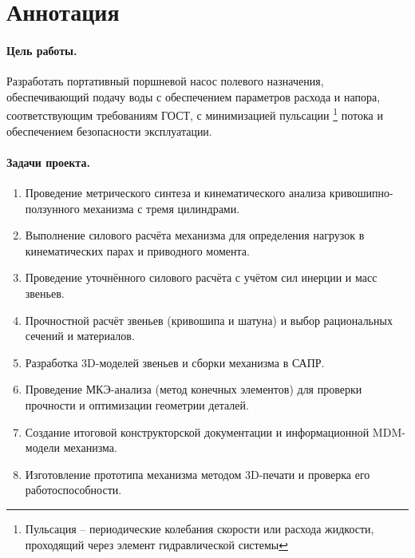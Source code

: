 \documentclass[12pt]{extarticle}
\begin{document}

\tableofcontents
\fancyhead[L]{\textit{\leftmark}}
\fancyhead[R]{}
\fancyfoot[C]{\thepage}
\clearpage

\section{Аннотация}
\paragraph{Цель работы.} Разработать портативный поршневой насос полевого назначения, обеспечивающий подачу воды
с обеспечением параметров расхода и напора, соответствующим требованиям ГОСТ, с минимизацией пульсации
\footnote{Пульсация -- периодические колебания скорости или расхода жидкости, проходящий через элемент гидравлической системы}
потока и обеспечением безопасности эксплуатации.

\paragraph{Задачи проекта.}
\begin{enumerate}
    \item Проведение метрического синтеза и кинематического анализа кривошипно-ползунного механизма с
    тремя цилиндрами.
    \item Выполнение силового расчёта механизма для определения нагрузок в кинематических парах и
    приводного момента.
    \item Проведение уточнённого силового расчёта с учётом сил инерции и масс звеньев.
    \item Прочностной расчёт звеньев (кривошипа и шатуна) и выбор рациональных сечений и материалов.
    \item Разработка 3D-моделей звеньев и сборки механизма в САПР.
    \item Проведение МКЭ-анализа (метод конечных элементов) для проверки прочности и оптимизации
    геометрии деталей.
    \item Создание итоговой конструкторской документации и информационной MDM-модели механизма.
    \item Изготовление прототипа механизма методом 3D-печати и проверка его работоспособности.
\end{enumerate}
\end{document}

